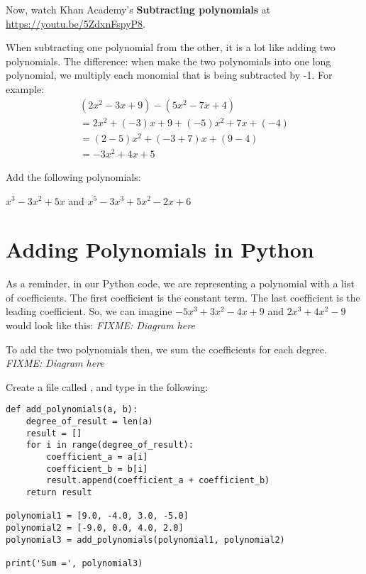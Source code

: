 Now, watch Khan Academy's \textbf{Subtracting polynomials} at \url{https://youtu.be/5ZdxnFspyP8}.

When subtracting one polynomial from the other, it is a lot like
adding two polynomials. The difference: when make the two polynomials
into one long polynomial, we multiply each monomial that is being
subtracted by -1. For example:
\begin{multline*}
  (2x^2 - 3x + 9) - (5x^2 - 7x + 4) \\
  = 2x^2 + (-3)x + 9 + (-5)x^2 + 7x + (-4) \\
  = (2 - 5)x^2 + (-3 + 7)x + (9-4) \\
  = -3x^2 + 4x + 5
\end{multline*}

\begin{Exercise}[title=Subtracting Polynomials Practice, label=subtractpns]
  Add the following polynomials:
  \vspace{20mm}
  \vspace{20mm}
\end{Exercise}
\begin{Answer}[ref=subtractpns]$x^3 - 3x^2 + 5x$ and $x^5 - 3x^3 + 5x^2 - 2x + 6$\end{Answer}

\section{Adding Polynomials in Python}

As a reminder, in our Python code, we are representing a polynomial
with a list of coefficients.  The first coefficient is the constant
term. The last coefficient is the leading coefficient. So, we can
imagine $-5x^3 + 3x^2 - 4x + 9$ and $2x^3 +4x^2 - 9$ would look
like this: \textit{FIXME: Diagram here}

To add the two polynomials then, we sum the coefficients for each degree.
\textit{FIXME: Diagram here}

Create a file called , and type in the following: 
\begin{Verbatim}
def add_polynomials(a, b):
    degree_of_result = len(a)
    result = []
    for i in range(degree_of_result):
        coefficient_a = a[i]
        coefficient_b = b[i]
        result.append(coefficient_a + coefficient_b)
    return result

polynomial1 = [9.0, -4.0, 3.0, -5.0]
polynomial2 = [-9.0, 0.0, 4.0, 2.0]
polynomial3 = add_polynomials(polynomial1, polynomial2)

print('Sum =', polynomial3)
\end{Verbatim}

